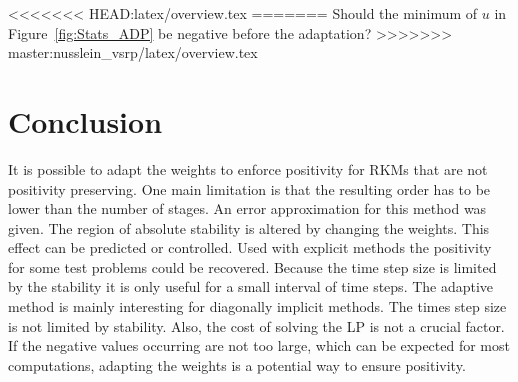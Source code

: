 \documentclass[a4paper]{article}
\numberwithin{equation}{section}
\theoremstyle{plain}
\theoremstyle{definition}
\numberwithin{theorem}{section}
\newcommand{\1}{\mathbbm{1}}
\newcommand{\todo}[1]{{\Large{\color{red}{#1}}}}
\begin{document}
<<<<<<< HEAD:latex/overview.tex
=======
\todo{Note (HR)} Should the minimum of $u$ in Figure~\ref{fig:Stats_ADP} be negative before the adaptation? %
>>>>>>> master:nusslein_vsrp/latex/overview.tex


\section{Conclusion} \label{sec:conclusion}
It is possible to adapt the weights to enforce positivity for RKMs that are not positivity preserving. 
One main limitation is that the resulting order has to be lower than the number of stages.
An error approximation for this method was given.  
The region of absolute stability is altered by changing the weights. This effect can be predicted or controlled. 
Used with explicit methods the positivity for some test problems could be recovered.  
Because the time step size is limited by the stability it is only useful for a small interval of time steps. 
The adaptive method is mainly interesting for diagonally implicit methods.
The times step size is not limited by stability. 
Also, the cost of solving the LP is not a crucial factor.  
If the negative values occurring are not too large, which can be expected for most computations, adapting the weights is a potential way to ensure positivity. 




\printbibliography
\end{document}
